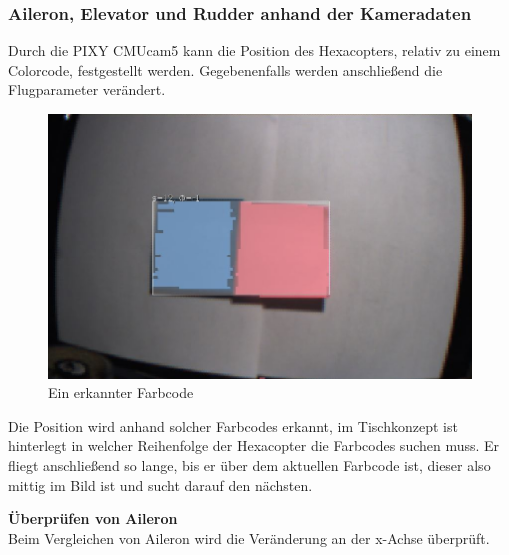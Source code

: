     \subsubsection{Aileron, Elevator und Rudder anhand der Kameradaten}
    Durch die PIXY CMUcam5 kann die Position des Hexacopters, relativ zu einem Colorcode, festgestellt werden. Gegebenenfalls werden anschließend die Flugparameter verändert.

    \begin{figure} [H]
      \begin{centering}
        \includegraphics[width = \textwidth]{Bilder/Farbcode_erkannt}
      \par\end{centering}
      \caption{Ein erkannter Farbcode}
      \label{Farbcode_erkannt}
    \end{figure}
    Die Position wird anhand solcher Farbcodes erkannt, im Tischkonzept ist hinterlegt in welcher Reihenfolge der Hexacopter die Farbcodes suchen muss.
    Er fliegt anschließend so lange, bis er über dem aktuellen Farbcode ist, dieser also mittig im Bild ist und sucht darauf den nächsten.


    \textbf{Überprüfen von Aileron}\\
    Beim Vergleichen von Aileron wird die Veränderung an der x-Achse überprüft.

